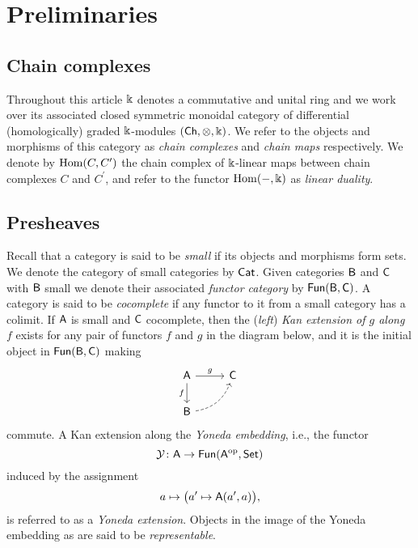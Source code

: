 
\section{Preliminaries} \label{s:preliminaries}

\subsection{Chain complexes}

Throughout this article $\Bbbk$ denotes a commutative and unital ring and we work over its associated closed symmetric monoidal category of differential (homologically) graded $\Bbbk$-modules $(\mathsf{Ch}, \otimes, \Bbbk)$.
We refer to the objects and morphisms of this category as \textit{chain complexes} and \textit{chain maps} respectively.
We denote by $\mathrm{Hom}(C, C^\prime)$ the chain complex of $\Bbbk$-linear maps between chain complexes $C$ and $C^\prime$, and refer to the functor $\mathrm{Hom}(-, \Bbbk)$ as \textit{linear duality}.

\subsection{Presheaves}

Recall that a category is said to be \textit{small} if its objects and morphisms form sets.
We denote the category of small categories by $\mathsf{Cat}$.
Given categories $\mathsf{B}$ and $\mathsf{C}$ with $\mathsf{B}$ small we denote their associated \textit{functor category} by $\mathsf{Fun}(\mathsf{B}, \mathsf{C})$.
A category is said to be \textit{cocomplete} if any functor to it from a small category has a colimit.
If $\mathsf{A}$ is small and $\mathsf{C}$ cocomplete, then the (\textit{left}) \textit{Kan extension of $g$ along $f$} exists for any pair of functors $f$ and $g$ in the diagram below, and it is the initial object in $\mathsf{Fun}(\mathsf{B}, \mathsf{C})$ making
\begin{equation*}
\begin{tikzcd}[column sep=normal, row sep=normal]
\sA \arrow[d, "f"'] \arrow[r, "g"] & \sC \\
\sB \arrow[dashed, ur, bend right] & \quad
\end{tikzcd}
\end{equation*}
commute.
A Kan extension along the \textit{Yoneda embedding}, i.e., the functor
\[
\operatorname{\mathcal{Y}} \colon \mathsf{A} \to \mathsf{Fun}(\mathsf{A}^{\mathrm{op}}, \mathsf{Set})
\]
induced by the assignment
\[
a \mapsto \big( a^\prime \mapsto \mathsf{A}(a^\prime, a) \big),
\]
is referred to as a \textit{Yoneda extension}.
Objects in the image of the Yoneda embedding as are said to be \textit{representable}.

